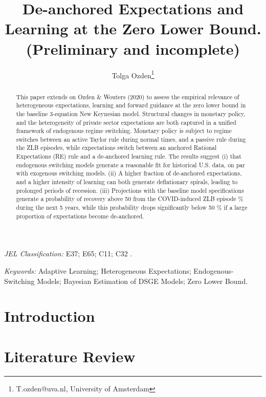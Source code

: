 \documentclass[12pt]{article}
\title{De-anchored Expectations and Learning at the Zero Lower Bound.\\
(Preliminary and incomplete)}\vspace{10 mm}
\author{Tolga Ozden\footnote{T.ozden@uva.nl, University of Amsterdam}}
\numberwithin{equation}{section}
\begin{document}
\maketitle



\begin{abstract}

This paper extends on Ozden \& Wouters (2020) to assess the empirical relevance of heterogeneous expectations, learning and forward guidance at the zero lower bound in the baseline 3-equation New Keynesian model. Structural changes in monetary policy, and the heterogeneity of private sector expectations are both captured in a unified framework of endogenous regime switching. Monetary policy is subject to regime switches between an active Taylor rule during normal times, and a passive rule during the ZLB episodes, while expectations switch between an anchored Rational Expectations (RE) rule and a de-anchored learning rule. The results suggest (i) that endogenous switching models generate a reasonable fit for historical U.S. data, on par with exogenous switching models. (ii) A higher fraction of de-anchored expectations, and a higher intensity of learning can both generate deflationary spirals, leading to prolonged periods of recession. (iii) Projections with the baseline model specifications generate a probability of recovery above 50 from the COVID-induced ZLB episode \% during the next 5 years, while this probability drops significantly below 50 \% if a large proportion of expectations become de-anchored. 


\end{abstract}

\vspace{3 mm}

\noindent
\textit{JEL Classification:} E37; E65; C11; C32 . \\


\vspace{3 mm}

\noindent
\textit{Keywords:} Adaptive Learning; Heterogeneous Expectations; Endogenous-Switching Models; Bayesian Estimation of DSGE Models; Zero Lower Bound. 

\newpage


\section{Introduction}

\section{Literature Review}
\end{document}
